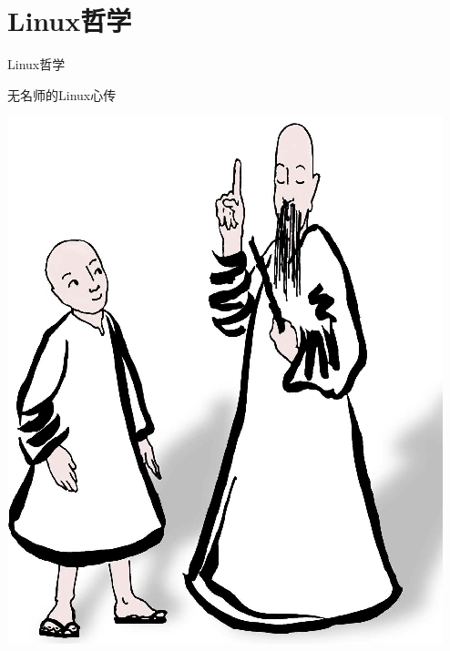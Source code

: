 \section {Linux哲学}
\begin{frame}{Linux哲学}
\pause
\begin{center}

\end{center}
\end{frame}


\begin{frame}{无名师的Linux心传}
\begin{center}
\includegraphics[height=0.7\textheight]{images/zen-linux.png} 
\end{center}
\end{frame}

